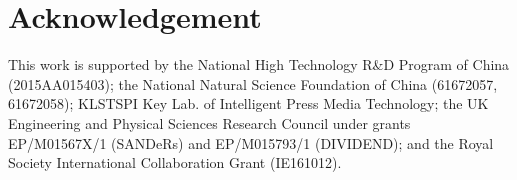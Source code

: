 \section*{Acknowledgement}
This work is supported by the National High Technology R\&D Program of China (2015AA015403); 
the National Natural Science Foundation of China (61672057, 61672058);
KLSTSPI Key Lab. of Intelligent Press Media Technology;
the UK Engineering and Physical Sciences Research Council under
grants EP/M01567X/1 (SANDeRs) and EP/M015793/1 (DIVIDEND);
and the Royal Society International Collaboration Grant (IE161012).